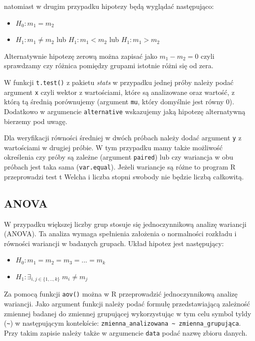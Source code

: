 \documentclass[
]{book}
\providecommand{\tightlist}{%
  \setlength{\itemsep}{0pt}\setlength{\parskip}{0pt}}
\begin{document}
natomiast w drugim przypadku hipotezy będą wyglądać następująco:

\begin{itemize}
\tightlist
\item
  \(H_0: m_1 = m_2\)
\item
  \(H_1: m_1 \neq m_2\) lub \(H_1: m_1 < m_2\) lub \(H_1: m_1 > m_2\)
\end{itemize}

Alternatywnie hipotezę zerową można zapisać jako \(m_1 - m_2 = 0\) czyli sprawdzamy czy różnica pomiędzy grupami istotnie różni się od zera.

W funkcji \texttt{t.test()} z pakietu \emph{stats} w przypadku jednej próby należy podać argument \texttt{x} czyli wektor z wartościami, które są analizowane oraz wartość, z którą tą średnią porównujemy (argument \texttt{mu}, który domyślnie jest równy 0). Dodatkowo w argumencie \texttt{alternative} wskazujemy jaką hipotezę alternatywną bierzemy pod uwagę.

Dla weryfikacji równości średniej w dwóch próbach należy dodać argument \texttt{y} z wartościami w drugiej próbie. W tym przypadku mamy także możliwość określenia czy próby są zależne (argument \texttt{paired}) lub czy wariancja w obu próbach jest taka sama (\texttt{var.equal}). Jeżeli wariancje są różne to program R przeprowadzi test t Welcha i liczba stopni swobody nie będzie liczbą całkowitą.

\hypertarget{anova}{%
\subsection{ANOVA}\label{anova}}

W przypadku większej liczby grup stosuje się jednoczynnikową analizę wariancji (ANOVA). Ta analiza wymaga spełnienia założenia o normalności rozkładu i równości wariancji w badanych grupach. Układ hipotez jest następujący:

\begin{itemize}
\tightlist
\item
  \(H_0: m_1 = m_2 = m_3 = ... = m_k\)
\item
  \(H_1: \exists_{i,j\in\{1,..,k\}} \; m_i \neq m_j\)
\end{itemize}

Za pomocą funkcji \texttt{aov()} można w R przeprowadzić jednoczynnikową analizę wariancji. Jako argument funkcji należy podać formułę przedstawiającą zależność zmiennej badanej do zmiennej grupującej wykorzystując w tym celu symbol tyldy (\texttt{\textasciitilde{}}) w następującym kontekście: \texttt{zmienna\_analizowana\ \textasciitilde{}\ zmienna\_grupująca}. Przy takim zapisie należy także w argumencie \texttt{data} podać nazwę zbioru danych.
\end{document}

